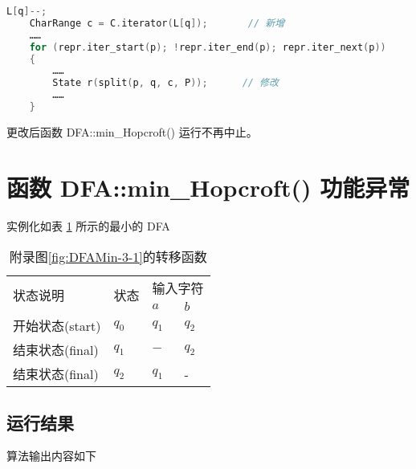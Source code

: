 \begin{lstlisting}[language=C++,label={lst:hopcroft-iter-edit},caption={ min-hop.cpp },firstnumber=68]
    L[q]--;
    CharRange c = C.iterator(L[q]);       // 新增
    ……
    for (repr.iter_start(p); !repr.iter_end(p); repr.iter_next(p))
    {
        ……
        State r(split(p, q, c, P));      // 修改
        ……
    }
\end{lstlisting}

更改后函数 DFA::min\_Hopcroft() 运行不再中止。



\section{函数 DFA::min\_Hopcroft() 功能异常}\label{sec:fixHopcroft}

实例化如表 \ref{tab:DFA8-b} 所示的最小的 DFA

\begin{table}[!htbp]
    \caption{附录图\ref{fig:DFAMin-3-1}的转移函数}
    \label{tab:DFA8-b}
    \centering
    \small%
    \setlength{\tabcolsep}{4pt}%
    \renewcommand{\arraystretch}{1.2}%
        \begin{tabular}{l p{4em}<{\centering} p{3em}<{\centering} p{3em}<{\centering}}
        \toprule %
        \multirow{2}{*}{状态说明} & \multirow{2}{*}{状态} & \multicolumn{2}{c}{输入字符} \\
		\cline{3-4}      &    & $a$ & $b$  \\
        \midrule%
        开始状态(start)  & $q_0$ & $q_1$   & $q_2$   \\
        结束状态(final)  & $q_1$ & $ - $   &  $q_2$  \\
        结束状态(final)  & $q_2$ & $q_1$   &  -  \\
        \bottomrule%
    \end{tabular}
\end{table}

\subsection{运行结果}

算法输出内容如下

